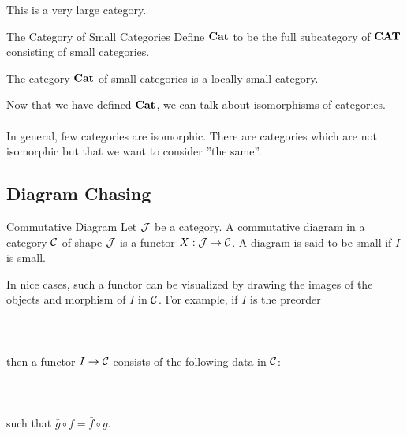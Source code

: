 \documentclass[a4paper]{article}
\begin{document}
This is a very large category. 

\begin{defn}{The Category of Small Categories}{} Define $\bold{Cat}$ to be the full subcategory of $\bold{CAT}$ consisting of small categories. 
\end{defn}

\begin{lmm}{}{} The category $\bold{Cat}$ of small categories is a locally small category. 
\end{lmm}

Now that we have defined $\bold{Cat}$, we can talk about isomorphisms of categories. \\~\\

In general, few categories are isomorphic. There are categories which are not isomorphic but that we want to consider ''the same''. 

\subsection{Diagram Chasing}
\begin{defn}{Commutative Diagram}{} Let $\mathcal{J}$ be a category. A commutative diagram in a category $\mathcal{C}$ of shape $\mathcal{J}$ is a functor $X:\mathcal{J}\to\mathcal{C}$. A diagram is said to be small if $I$ is small. 
\end{defn}

In nice cases, such a functor can be visualized by drawing the images of the objects and morphism of $I$ in $\mathcal{C}$. For example, if $I$ is the preorder \\~\\
\\~\\
then a functor $I\to\mathcal{C}$ consists of the following data in $\mathcal{C}$: \\~\\
\\~\\
such that $\bar{g}\circ f=\bar{f}\circ g$. \\~\\
\end{document}
